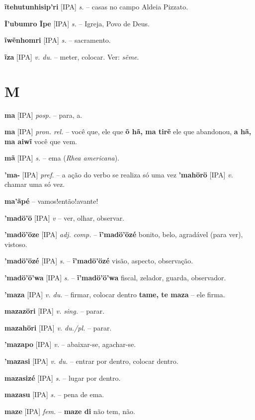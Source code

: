 \textbf{ĩtehutunhisip'ri} [IPA] \textit{s.} -- casas no campo  Aldeia Pizzato.

\textbf{Ĩ'ubumro Ĩpe} [IPA] \textit{s.} -- Igreja, Povo de Deus.

\textbf{ĩwẽnhomri} [IPA] \textit{s.} -- sacramento.

\textbf{ĩza} [IPA] \textit{v. du.} -- meter, colocar. Ver: \textit{sẽme}.


\section*{M}


\textbf{ma} [IPA] \textit{posp.} -- para, a.

\textbf{ma} [IPA] \textit{pron. rel.} -- você que, ele que  \textbf{õ hã, ma tirẽ} ele que abandonou, \textbf{a hã, ma aiwĩ} você que vem.

\textbf{mã} [IPA] \textit{s.} -- ema (\textit{Rhea americana}).

\textbf{'ma-} [IPA] \textit{pref.} -- a ação do verbo se realiza só uma vez  \textbf{'mahörö} [IPA] \textit{v.} chamar uma só vez.

\textbf{ma'ãpé} -- vamos!então!avante!

\textbf{'madö'ö} [IPA] \textit{v} -- ver, olhar, observar.

\textbf{'madö'öze} [IPA] \textit{adj. comp.} -- \textbf{ĩ'madö'özé} bonito, belo, agradável (para ver), vistoso.

\textbf{'madö'özé} [IPA] \textit{s.} -- \textbf{ĩ'madö'özé} visão, aspecto, observação.

\textbf{'madö'ö'wa} [IPA] \textit{s.} -- \textbf{ĩ'madö'ö'wa} fiscal, zelador, guarda, observador.

\textbf{'maza} [IPA] \textit{v. du.} -- firmar, colocar dentro  \textbf{tame, te maza} -- ele firma.

\textbf{mazazöri} [IPA] \textit{v. sing.} -- parar.

\textbf{mazahöri} [IPA] \textit{v. du./pl.} -- parar.

\textbf{'mazapo} [IPA] \textit{v.} -- abaixar-se, agachar-se.

\textbf{'mazasi} [IPA] \textit{v. du.} -- entrar por dentro, colocar dentro.

\textbf{mazasizé} [IPA] \textit{s.} -- lugar por dentro.

\textbf{mazasu} [IPA] \textit{s.} -- pena de ema.

\textbf{maze} [IPA] \textit{fem.} -- \textbf{maze di} não tem, não.

